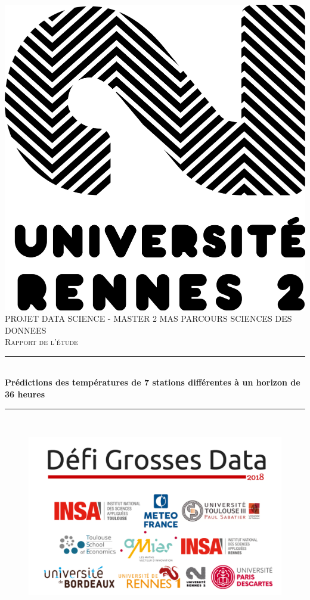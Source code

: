 \documentclass[14pt, openany]{article}
\newcommand{\HRule}{\rule{\linewidth}{0.5mm}}
\begin{document}
\begin{titlepage}
\begin{center}
\includegraphics[scale=0.15]{Images/ur2.png}\\
\bigskip
\textsc{\Large PROJET DATA SCIENCE - MASTER 2 MAS PARCOURS SCIENCES DES DONNEES\\ 
\bigskip
Rapport de l'étude}\\
\bigskip
    \HRule \\[0.4cm]
    { \huge \bfseries Prédictions des températures de 7 stations différentes à un horizon de 36 heures\\[0.4cm] }
        \HRule \\[2cm]
   \begin{figure}[h]
    \begin{minipage}[c]{.46\linewidth}
        \centering
        \includegraphics[scale=0.3]{Images/defi.png}

\end{minipage}
\end{figure}
\end{center}
\end{titlepage}
\end{document}
